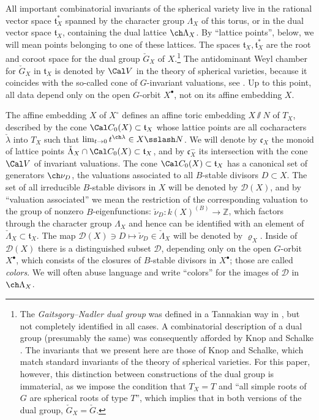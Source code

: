 \documentclass[final]{amsart}
\theoremstyle{remark}
\theoremstyle{definition}
\numberwithin{equation}{section}
\begin{document}
All important combinatorial invariants of the spherical variety live in the rational vector space $\mathfrak t_X^*$ spanned by the character group $\Lambda_X$ of this torus, or in the dual vector space $\mathfrak t_X$, containing the dual lattice $\ch\Lambda_X$. By ``lattice points'', below, we will mean points belonging to one of these lattices. The spaces $\mathfrak t_X, \mathfrak t_X^*$ are the root and coroot space for the dual group $\check G_X$ of $X$.\footnote{The \emph{Gaitsgory--Nadler dual group} was defined in a Tannakian way in \cite{GN}, but not completely identified in all cases. A combinatorial description  of a dual group (presumably the same) was consequently afforded by Knop and Schalke \cite{Knop-Schalke}. The invariants that we present here are those of Knop and Schalke, which match standard invariants of the theory of spherical varieties. For this paper, however, this distinction between constructions of the dual group is immaterial, as we impose the condition that $T_X= T$ and ``all simple roots of $G$ are spherical roots of type $T$'', which implies that in both versions of the dual group, $\check G_X= \check G$.} The antidominant Weyl chamber for $\check G_X$ in $\mathfrak t_X$ is denoted by $\Cal V$ in the theory of spherical varieties, because it coincides with the so-called cone of $G$-invariant valuations, see \cite{KnLV}. Up to this point, all data depend only on the open $G$-orbit $X^\bullet$, not on its affine embedding $X$.

The affine embedding $X$ of $X^\circ$ defines an affine toric embedding $X\sslash N$ of $T_X$, described by the cone $\Cal C_0(X) \subset \mathfrak t_X$ whose lattice points are all cocharacters $\check\lambda$ into $T_X$ such that $\lim_{t\to 0} t^{\ch\lambda}\in X\sslash N$. We will denote by $\mathfrak c_X$ the monoid of lattice points $\check\Lambda_X \cap \Cal C_0(X) \subset \mathfrak t_X$, and by $\mathfrak c_X^-$ its intersection with the cone $\Cal V$ of invariant valuations. 
The cone $\Cal C_0(X)\subset \mathfrak t_X$ has a canonical set of generators $\ch\nu_D$, the valuations associated to all $B$-stable divisors $D\subset X$. The set of all irreducible $B$-stable divisors in $X$ will be denoted by $\mathcal D(X)$, and by ``valuation associated'' we mean the restriction of the corresponding valuation to the group of nonzero $B$-eigenfunctions: $\check \nu_D: k(X)^{(B)} \to \mathbb Z$, which factors through the character group $\Lambda_X$ and hence can be identified with an element of $\check\Lambda_X\subset \mathfrak t_X$. The map $\mathcal D(X)\ni D\mapsto \check\nu_D\in \check\Lambda_X$ will be denoted by $\varrho_X$. Inside of $\mathcal D(X)$ there is a distinguished subset $\mathcal D$, depending only on the open $G$-orbit $X^\bullet$, which consists of the closures of $B$-stable divisors in $X^\bullet$; those are called \emph{colors}. We will often abuse language and write ``colors'' for the images of $\mathcal D$ in $\ch\Lambda_X$.
\end{document}
